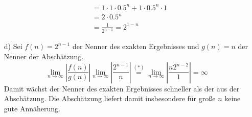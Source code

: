 \begin{enumerate}
\begin{equation*}
\begin{split}
											&= 1 \cdot 1 \cdot 0.5^n + 1 \cdot 0.5^n \cdot 1\\
											&= 2 \cdot 0.5^n\\
											&= \frac{1}{2^{n-1}}= 2^{1-n}
			\end{split}
		\end{equation*}
	\item[d)] Sei $f(n) = 2^{n - 1}$ der Nenner des exakten Ergebnisses und $g(n) = n$ der Nenner der Abschätzung.
		\begin{equation*}
			\lim\limits_{n \rightarrow \infty} |\frac{f(n)}{g(n)}| \lim\limits_{n\rightarrow \infty} |\frac{2^{n-1}}{n}| \stackrel{(*)}{=} \lim\limits_{n \rightarrow \infty} |\frac{n2^{n-2}}{1}| = \infty
		\end{equation*}
		Damit wächst der Nenner des exakten Ergebnisses schneller als der aus der Abschätzung. Die Abschätzung liefert damit insbesondere für große $n$ keine gute Annäherung.		
\end{enumerate}


